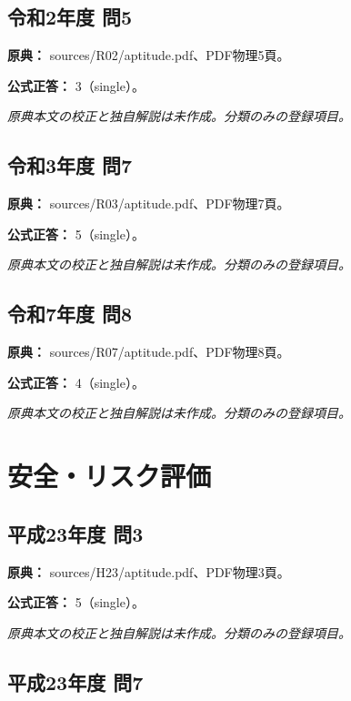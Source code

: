 \subsection{令和2年度 問5}
\label{q:r02-reg-apt-05}

\noindent\textbf{原典：} sources/R02/aptitude.pdf、PDF物理5頁。

\textbf{公式正答：} 3（single）。

\par\textit{原典本文の校正と独自解説は未作成。分類のみの登録項目。}

\subsection{令和3年度 問7}
\label{q:r03-reg-apt-07}

\noindent\textbf{原典：} sources/R03/aptitude.pdf、PDF物理7頁。

\textbf{公式正答：} 5（single）。

\par\textit{原典本文の校正と独自解説は未作成。分類のみの登録項目。}

\subsection{令和7年度 問8}
\label{q:r07-reg-apt-08}

\noindent\textbf{原典：} sources/R07/aptitude.pdf、PDF物理8頁。

\textbf{公式正答：} 4（single）。

\par\textit{原典本文の校正と独自解説は未作成。分類のみの登録項目。}

\section{安全・リスク評価}

\subsection{平成23年度 問3}
\label{q:h23-reg-apt-03}

\noindent\textbf{原典：} sources/H23/aptitude.pdf、PDF物理3頁。

\textbf{公式正答：} 5（single）。

\par\textit{原典本文の校正と独自解説は未作成。分類のみの登録項目。}

\subsection{平成23年度 問7}
\label{q:h23-reg-apt-07}

